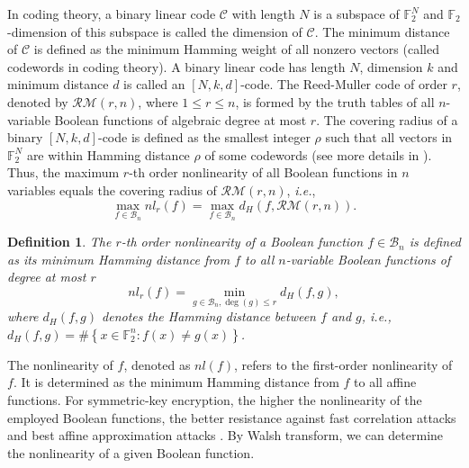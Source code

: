 \documentclass[preprint,10pt]{elsarticle}
\newcommand{\F}{\mathbb{F}}
\newcommand{\0}{\textbf{0}}
\newcommand{\1}{\textbf{1}}
\theoremstyle{plain}
\newtheorem{definition}{Definition}
\begin{document}
    In coding theory, a binary linear code $\mathcal{C}$ with length $N$ is a subspace of $\F_2^N$ and $\F_2$-dimension of this subspace is called the dimension of $\mathcal{C}$.
    The minimum distance of $\mathcal{C}$ is defined as the minimum Hamming weight of all nonzero vectors (called codewords in coding theory).
    A binary linear code has length $N$, dimension $k$ and minimum distance $d$ is called an $\left[ N,k,d \right]$-code.
    The Reed-Muller code of order $r$, denoted by $\mathcal{RM}(r,n)$, where $1\le r\le n$, is formed by the truth tables of all $n$-variable Boolean functions of algebraic degree at most $r$. The covering radius of a binary $\left[ N,k,d \right]$-code is defined as the smallest integer $\rho$ such that all
    vectors in $\F_2^N$ are within Hamming distance $\rho$ of some codewords (see more details in \cite{MS1977}).
    Thus, the maximum $r$-th order nonlinearity of all Boolean functions in $n$ variables equals the covering radius of $\mathcal{RM}(r,n)$, \emph{i.e.},
    \[\max_{f\in \mathcal{B}_n}nl_r(f)=\max_{f\in\mathcal{B}_n}d_H(f,\mathcal{RM}(r,n)).\]
    \begin{definition}
        The $r$-th order nonlinearity of a Boolean function $f\in\mathcal{B}_n$ is defined as its minimum Hamming distance from $f$ to all $n$-variable Boolean functions of degree at most $r$
        \[nl_r(f)=\min_{g\in\mathcal{B}_n,\deg(g)\le r} d_H(f,g),\]
        where $d_H(f,g)$ denotes the Hamming distance between $f$ and $g$, i.e., $d_H(f,g)=\#\left\{ x\in\F_2^n : f(x)\ne g(x) \right\}$.
    \end{definition}
    The nonlinearity of $f$, denoted as $nl(f)$, refers to the first-order nonlinearity of $f$. 
    It is determined as the minimum Hamming distance from $f$ to all affine functions.
    For symmetric-key encryption, the higher the nonlinearity of the employed Boolean functions, the better resistance against fast correlation attacks \cite{MS1988fast_correlation_attack} and best affine approximation attacks \cite{DingXS1991book}.
    By Walsh transform, we can determine the nonlinearity of a given Boolean function. 
\end{document}
